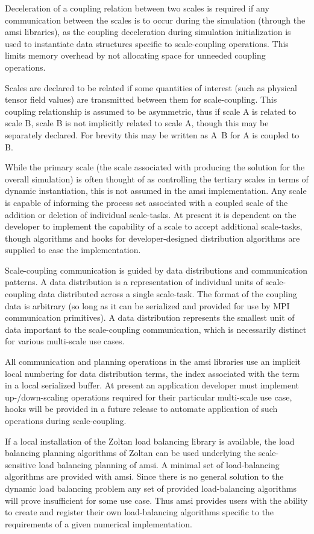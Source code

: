 \documentclass[11pt]{siamltex1213}
\begin{document}
Deceleration of a coupling relation between two scales is required if any communication between the scales is to occur during the simulation (through the amsi libraries), as the coupling deceleration during simulation initialization is used to instantiate data structures specific to scale-coupling operations. This limits memory overhead by not allocating space for unneeded coupling operations.

Scales are declared to be related if some quantities of interest (such as physical tensor field values) are transmitted between them for scale-coupling. This coupling relationship is assumed to be asymmetric, thus if scale A is related to scale B, scale B is not implicitly related to scale A, though this may be separately declared. For brevity this may be written as A~B for A is coupled to B.

While the primary scale (the scale associated with producing the solution for the overall simulation) is often thought of as controlling the tertiary scales in terms of dynamic instantiation, this is not assumed in the amsi implementation. Any scale is capable of informing the process set associated with a coupled scale of the addition or deletion of individual scale-tasks. At present it is dependent on the developer to implement the capability of a scale to accept additional scale-tasks, though algorithms and hooks for developer-designed distribution algorithms are supplied to ease the implementation.

\label{amsi_communication}
Scale-coupling communication is guided by data distributions and communication patterns. A data distribution is a representation of individual units of scale-coupling data distributed across a single scale-task. The format of the coupling data is arbitrary (so long as it can be serialized and provided for use by MPI communication primitives). A data distribution represents the smallest unit of data important to the scale-coupling communication, which is necessarily distinct for various multi-scale use cases. 

All communication and planning operations in the amsi libraries use an implicit local numbering for data distribution terms, the index associated with the term in a local serialized buffer. At present an application developer must implement up-/down-scaling operations required for their particular multi-scale use case, hooks will be provided in a future release to automate application of such operations during scale-coupling.

\label{amsi_load_balancing}
If a local installation of the Zoltan \cite{ZoltanOverviewArticle2002} \cite{ZoltanIsorropiaOverview2012} load balancing library is available, the load balancing planning algorithms of Zoltan can be used underlying the scale-sensitive load balancing planning of amsi. A minimal set of load-balancing algorithms are provided with amsi. Since there is no general solution to the dynamic load balancing problem any set of provided load-balancing algorithms will prove insufficient for some use case. Thus amsi provides users with the ability to create and register their own load-balancing algorithms specific to the requirements of a given numerical implementation.
\end{document}
